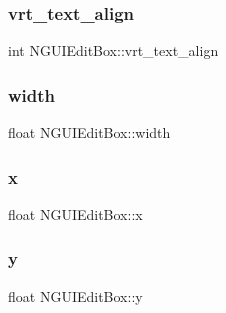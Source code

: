 \subsubsection{\texorpdfstring{vrt\+\_\+text\+\_\+align}{vrt\_text\_align}}
{\footnotesize\ttfamily int N\+G\+U\+I\+Edit\+Box\+::vrt\+\_\+text\+\_\+align}

\hypertarget{class_n_g_u_i_edit_box_a5bde94821ae8fd14caf26a3e09198226}{}\label{class_n_g_u_i_edit_box_a5bde94821ae8fd14caf26a3e09198226} 
\subsubsection{\texorpdfstring{width}{width}}
{\footnotesize\ttfamily float N\+G\+U\+I\+Edit\+Box\+::width}

\hypertarget{class_n_g_u_i_edit_box_a657762d6aab1d571e88ea1b814e13160}{}\label{class_n_g_u_i_edit_box_a657762d6aab1d571e88ea1b814e13160} 
\subsubsection{\texorpdfstring{x}{x}}
{\footnotesize\ttfamily float N\+G\+U\+I\+Edit\+Box\+::x}

\hypertarget{class_n_g_u_i_edit_box_a03029bce54e99811f813da1c351080ee}{}\label{class_n_g_u_i_edit_box_a03029bce54e99811f813da1c351080ee} 
\subsubsection{\texorpdfstring{y}{y}}
{\footnotesize\ttfamily float N\+G\+U\+I\+Edit\+Box\+::y}


